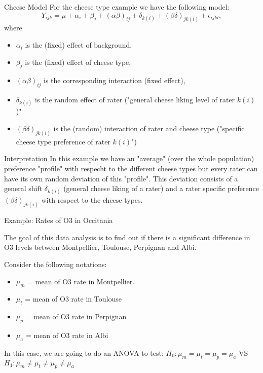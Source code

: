 \documentclass[unknownkeysallowed]{beamer}
\begin{document}
\begin{frame}{Cheese Model}
	For the cheese type example we have the following model:
	\begin{equation*}
		Y_{ijk} = \mu + \alpha_i + \beta_j + (\alpha \beta)_{ij} +\delta_{k(i)} + (\beta \delta)_{jk(i)} + \epsilon_{ijkl},
	\end{equation*}
	where
	\begin{itemize}
		\item $\alpha_i$ is the (fixed) effect of background,
		\item $\beta_j$ is the (fixed) effect of cheese type,
		\item $(\alpha \beta)_{ij}$ is the corresponding interaction (fixed effect),
		\item $\delta_{k(i)}$ is the random effect of rater ("general cheese liking level of rater $k(i)$)"
		\item $(\beta \delta)_{jk(i)}$ is the (random) interaction of rater and cheese type ("specific cheese type preference of rater $k(i)$")
	\end{itemize}
\end{frame}

\begin{frame}{Interpretation}
	In this example we have an "average" (over the whole population) preference "profile" with respecht to the different cheese types but every rater can have its own random deviation of this "profile". This deviation consists of a general shift $\delta_{k(i)}$ (general cheese liking of a rater) and a rater specific preference $(\beta \delta)_{jk(i)}$ with respect  to the cheese types.
\end{frame}

\begin{frame}{Example: Rates of O3 in Occitania}

The goal of this data analysis is to find out if there is a significant difference in O3 levels between Montpellier, Toulouse, Perpignan and Albi. 

\vspace{0.2cm}

Consider the following notations:
\begin{itemize}
\item{$\mu_m$ = mean of O3 rate in Montpellier.}
\item{$\mu_t$ = mean of O3 rate in Toulouse}
\item{$\mu_p$ = mean of O3 rate in Perpignan}
\item{$\mu_a$ = mean of O3 rate in Albi}
\end{itemize}

\vspace{0.2cm}

In this case, we are going to do an ANOVA to test:
$H_0:\mu_m=\mu_t=\mu_p=\mu_a$ VS $H_1:\mu_m \neq \mu_t \neq \mu_p \neq \mu_a$
\end{frame}
\end{document}
